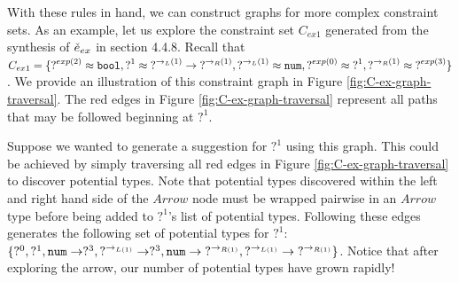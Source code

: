 With these rules in hand, we can construct graphs for more complex constraint sets. As an example, let us explore the constraint set $C_{ex1}$ generated from the synthesis of $\check{e}_{ex}$ in section 4.4.8. Recall that $C_{ex1} = \{ \operatorname{?}^{exp(2)} \approx \mathtt{bool}, \operatorname{?}^1 \approx \operatorname{?}^{\rightarrow_L(1)} \rightarrow \operatorname{?}^{\rightarrow_R(1)},  \operatorname{?}^{\rightarrow_L(1)} \approx \mathtt{num}, \operatorname{?}^{exp(0)} \approx \operatorname{?}^{1}, \operatorname{?}^{\rightarrow_R(1)} \approx \operatorname{?}^{exp(3)} \}$. We provide an illustration of this constraint graph in Figure \ref{fig:C-ex-graph-traversal}. The red edges in Figure \ref{fig:C-ex-graph-traversal} represent all paths that may be followed beginning at $?^1$. 

Suppose we wanted to generate a suggestion for $?^1$ using this graph. This could be achieved by simply traversing all red edges in Figure \ref{fig:C-ex-graph-traversal} to discover potential types. Note that potential types discovered within the left and right hand side of the $Arrow$ node must be wrapped pairwise in an $Arrow$ type before being added to $?^1$'s list of potential types. Following these edges generates the following set of potential types for $?^1$: $\{  ?^0, ?^1, \mathtt{num} \rightarrow ?^3, \mathtt{?}^{\rightarrow_{L(1)}} \rightarrow ?^3, \mathtt{num} \rightarrow \mathtt{?}^{\rightarrow_{R(1)}}, \mathtt{?}^{\rightarrow_{L(1)}} \rightarrow \mathtt{?}^{\rightarrow_{R(1)}}  \}$. Notice that after exploring the arrow, our number of potential types have grown rapidly!

